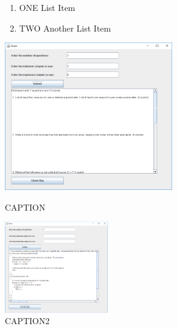 \begin{figure}[h]
\centering

\begin{minipage}{0.3\textwidth}
\begin{enumerate}

  \item ONE List Item
  \item TWO Another List Item

\end{enumerate}
\end{minipage}%
\begin{minipage}{0.7\textwidth}
\centering
    \vspace{-35pt}
    \includegraphics[width=0.65\textwidth]{images/exam-builder-01}
    \caption{CAPTION}
    \label{fig:exam-1}

    \includegraphics[width=0.4\textwidth]{images/exam-builder-02}
    \caption{CAPTION2}
    \label{fig:exam-2}

    
    
\end{minipage}

\end{figure}

